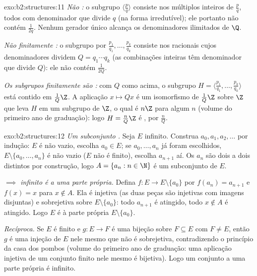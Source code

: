 \begin{solution}{exo:b2:structures:11}
\emph{Não :} o subgrupo $\langle \frac pq\rangle$ consiste
nos múltiplos inteiros de $\frac pq$, todos com
denominador que divide $q$ (na forma irredutível); ele portanto não contém
$\frac{1}{2q}$. Nenhum gerador único alcança os
denominadores ilimitados de $\Q$.

\emph{Não finitamente :} o subgrupo  por
$\frac{p_1}{q_1}, \dots, \frac{p_k}{q_k}$ consiste nos racionais
cujos denominadores dividem $Q = q_1 \cdots q_k$ (as combinações inteiras
têm denominador que divide $Q$): ele não contém $\frac{1}{2Q}$.

\emph{Os subgrupos finitamente  são :} com $Q$ como acima,
o subgrupo $H = \langle \frac{p_1}{q_1}, \dots,
\frac{p_k}{q_k}\rangle$ está contido em $\frac{1}{Q}\Z$. A aplicação $x
\mapsto Qx$ é um isomorfismo de $\frac1Q\Z$ sobre $\Z$ que leva
$H$ em um subgrupo de $\Z$, o qual é $n\Z$ para algum $n$ (volume do
primeiro ano de graduação): logo $H = \frac{n}{Q}\Z$ é ,  por
$\frac nQ$.
\end{solution}

\begin{solution}{exo:b2:structures:12}
\emph{Um subconjunto .} Seja $E$ infinito. Construa $a_0,
a_1, a_2, \dots$ por indução: $E$ é não vazio, escolha $a_0 \in E$;
se $a_0, \dots, a_n$ já foram escolhidos, $E \setminus \{a_0, \dots,
a_n\}$ é não vazio ($E$ não é finito), escolha $a_{n+1}$ aí. Os
$a_n$ são dois a dois distintos por construção, logo $A = \{a_n : n
\in \N\}$ é um subconjunto  de $E$.

\emph{$\implies$ infinito é  a uma parte própria.} Defina
$f \colon E \to E \setminus \{a_0\}$ por $f(a_n) = a_{n+1}$ e
$f(x) = x$ para $x \notin A$. Ela é injetiva (as duas peças são
injetivas com imagens disjuntas) e sobrejetiva sobre $E \setminus
\{a_0\}$: todo $a_{n+1}$ é atingido, todo $x \notin A$ é atingido. Logo
$E$ é  à parte própria $E \setminus \{a_0\}$.

\emph{Recíproca.} Se $E$ é finito e $g \colon E \to F$ é uma
bijeção sobre $F \subseteq E$ com $F \neq E$, então $g$ é uma
injeção de $E$ nele mesmo que não é sobrejetiva,
contradizendo o princípio da casa dos pombos (volume do primeiro ano de graduação: uma
aplicação injetiva de um conjunto finito nele mesmo é bijetiva). Logo um conjunto
 a uma parte própria é infinito.
\end{solution}

